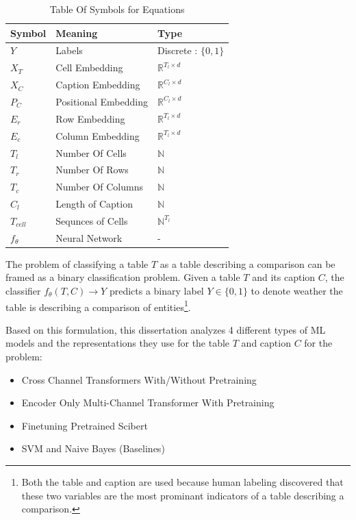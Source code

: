 \begin{table}
    \label{table\arabic{tablecounter}}
    \centering
    \begin{tabular}{|l|l|l|}
        \hline
        Symbol & Meaning & Type \\ \hline
        $Y$ & Labels & Discrete : $\{0,1\}$ \\ \hline
        $X_T$ & Cell Embedding & $\mathbb{R}^{T_l \times d}$\\ \hline
        $X_C$ & Caption Embedding & $\mathbb{R}^{C_l \times d}$ \\ \hline
        $P_C$ & Positional Embedding & $\mathbb{R}^{C_l \times d}$ \\ \hline
        $E_r$ & Row Embedding & $\mathbb{R}^{T_l \times d}$ \\ \hline
        $E_c$ & Column Embedding & $\mathbb{R}^{T_l \times d}$ \\ \hline
        $T_l$ & Number Of Cells & $\mathbb{N}$ \\ \hline
        $T_r$ & Number Of Rows & $\mathbb{N}$ \\ \hline
        $T_c$ & Number Of Columns & $\mathbb{N}$ \\ \hline
        $C_l$ & Length of Caption & $\mathbb{N}$ \\ \hline
        $T_{cell}$ & Sequnces of Cells & $\mathbb{N}^{T_l}$ \\ \hline
        $f_\theta$ & Neural Network & - \\ \hline
    \end{tabular}
    \caption{\label{tablecounter} Table Of Symbols for Equations}
\end{table}
The problem of classifying a table $T$ as a table describing a comparison can be framed as a binary classification problem. Given a table $T$ and its caption $C$, the classifier $f_\theta(T,C) \rightarrow Y$ predicts a binary label $Y \in \{0,1\}$ to denote weather the table is describing a comparison of entities\footnote{Both the table and caption are used because human labeling discovered that these two variables are the most prominant indicators of a table describing a comparison.}. 

Based on this formulation, this dissertation analyzes 4 different types of ML models and the representations they use for the table $T$ and caption $C$ for the problem:
\begin{itemize}
    \item Cross Channel Transformers With/Without Pretraining
    \item Encoder Only Multi-Channel Transformer With Pretraining
    \item Finetuning Pretrained Scibert
    \item SVM and Naive Bayes (Baselines)
\end{itemize}

